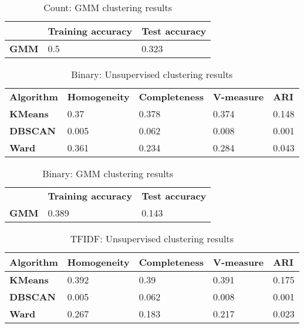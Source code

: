 \documentclass{article}
\begin{document}
\begin{table}[h]
\begin{tabular}{l|ll}
             & \textbf{Training accuracy} & \textbf{Test accuracy} \\ \hline
\textbf{GMM} & 0.5                      & 0.323                 
\end{tabular}
\caption{Count: GMM clustering results}
\end{table}

\begin{table}[h]
\begin{tabular}{lllll}
\textbf{Algorithm} & \textbf{Homogeneity} & \textbf{Completeness} & \textbf{V-measure} & \textbf{ARI} \\
\textbf{KMeans}    & 0.37                 & 0.378                 & 0.374              & 0.148                        \\
\textbf{DBSCAN}    & 0.005                & 0.062                 & 0.008              & 0.001                        \\
\textbf{Ward}      & 0.361                & 0.234                 & 0.284              & 0.043                       
\end{tabular}
\caption{Binary: Unsupervised clustering results}
\end{table}

\begin{table}[h]
\begin{tabular}{lll}
             & \textbf{Training accuracy} & \textbf{Test accuracy} \\
\textbf{GMM} & 0.389                      & 0.143                 
\end{tabular}
\caption{Binary: GMM clustering results}
\end{table}

\begin{table}[h]
\begin{tabular}{l|llll}
\textbf{Algorithm} & \textbf{Homogeneity} & \textbf{Completeness} & \textbf{V-measure} & \textbf{ARI} \\ \hline
\textbf{KMeans}    & 0.392                & 0.39                  & 0.391              & 0.175                        \\
\textbf{DBSCAN}    & 0.005                & 0.062                 & 0.008              & 0.001                        \\
\textbf{Ward}      & 0.267                & 0.183                 & 0.217              & 0.023                       
\end{tabular}
\caption{TFIDF: Unsupervised clustering results}
\end{table}
\end{document}
